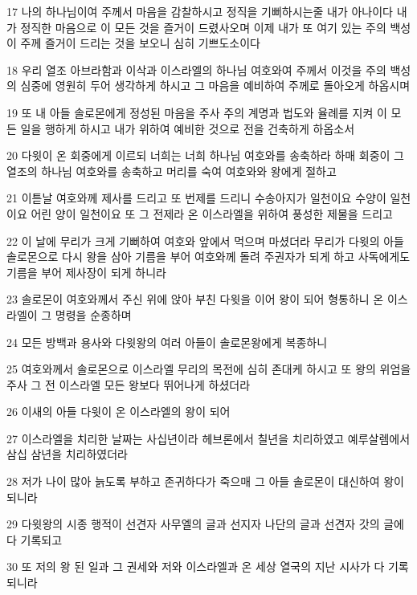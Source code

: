 \par 17 나의 하나님이여 주께서 마음을 감찰하시고 정직을 기뻐하시는줄 내가 아나이다 내가 정직한 마음으로 이 모든 것을 즐거이 드렸사오며 이제 내가 또 여기 있는 주의 백성이 주께 즐거이 드리는 것을 보오니 심히 기쁘도소이다
\par 18 우리 열조 아브라함과 이삭과 이스라엘의 하나님 여호와여 주께서 이것을 주의 백성의 심중에 영원히 두어 생각하게 하시고 그 마음을 예비하여 주께로 돌아오게 하옵시며
\par 19 또 내 아들 솔로몬에게 정성된 마음을 주사 주의 계명과 법도와 율례를 지켜 이 모든 일을 행하게 하시고 내가 위하여 예비한 것으로 전을 건축하게 하옵소서
\par 20 다윗이 온 회중에게 이르되 너희는 너희 하나님 여호와를 송축하라 하매 회중이 그 열조의 하나님 여호와를 송축하고 머리를 숙여 여호와와 왕에게 절하고
\par 21 이튿날 여호와께 제사를 드리고 또 번제를 드리니 수송아지가 일천이요 수양이 일천이요 어린 양이 일천이요 또 그 전제라 온 이스라엘을 위하여 풍성한 제물을 드리고
\par 22 이 날에 무리가 크게 기뻐하여 여호와 앞에서 먹으며 마셨더라 무리가 다윗의 아들 솔로몬으로 다시 왕을 삼아 기름을 부어 여호와께 돌려 주권자가 되게 하고 사독에게도 기름을 부어 제사장이 되게 하니라
\par 23 솔로몬이 여호와께서 주신 위에 앉아 부친 다윗을 이어 왕이 되어 형통하니 온 이스라엘이 그 명령을 순종하며
\par 24 모든 방백과 용사와 다윗왕의 여러 아들이 솔로몬왕에게 복종하니
\par 25 여호와께서 솔로몬으로 이스라엘 무리의 목전에 심히 존대케 하시고 또 왕의 위엄을 주사 그 전 이스라엘 모든 왕보다 뛰어나게 하셨더라
\par 26 이새의 아들 다윗이 온 이스라엘의 왕이 되어
\par 27 이스라엘을 치리한 날짜는 사십년이라 헤브론에서 칠년을 치리하였고 예루살렘에서 삼십 삼년을 치리하였더라
\par 28 저가 나이 많아 늙도록 부하고 존귀하다가 죽으매 그 아들 솔로몬이 대신하여 왕이 되니라
\par 29 다윗왕의 시종 행적이 선견자 사무엘의 글과 선지자 나단의 글과 선견자 갓의 글에 다 기록되고
\par 30 또 저의 왕 된 일과 그 권세와 저와 이스라엘과 온 세상 열국의 지난 시사가 다 기록되니라



